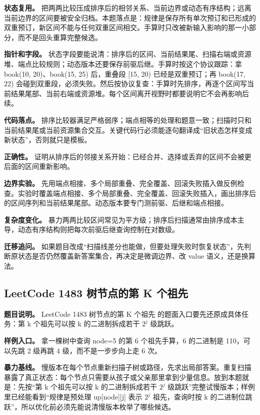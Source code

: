 \textbf{状态复用。} 把两两比较压成排序后的相邻关系、当前边界或动态有序结构；远离当前边界的区间要被安全归档。本题落点是：规律是保存所有单次预订和已形成的双重预订，新区间不能与任何双重区间相交。手算时只改被新输入影响的那一小部分，而不是回头重算完整候选。

\textbf{指针和字段。} 状态字段要能说清：排序后的区间、当前结果尾、扫描右端或资源堆、端点比较规则；动态版本还要保存前驱后继。手算时按这个协议跟踪：拿 book(10, 20)、book(15, 25) 后，重叠段 [15, 20) 已经是双重预订；再 book(17, 22) 会碰到双重段，必须失败。然后按协议复查：手算时先排序，再逐个区间写当前结果尾部、当前右端或资源堆。每个区间离开视野时都要说明它不会再影响后续。

\textbf{代码落点。} 排序比较器满足严格弱序；端点相等的处理和题意一致；扫描时只和当前结果尾或当前资源集合交互。关键代码行必须能逐句翻译成“旧状态怎样变成新状态”，否则就只是模板。

\textbf{正确性。} 证明从排序后的邻接关系开始：已经合并、选择或丢弃的区间不会被更后面的区间重新影响。

\textbf{边界实验。} 先用端点相接、多个局部重叠、完全覆盖、回滚失败插入做反例检查。实验时覆盖端点相接、多个局部重叠、完全覆盖、回滚失败插入，画出排序后的区间序列和当前结果尾部。动态版本要专门测前驱、后继和端点相接。

\textbf{复杂度变化。} 暴力两两比较区间常见为平方级；排序后扫描通常由排序成本主导，动态有序结构则把每次前驱后继查询控制在对数级。

\textbf{迁移追问。} 如果题目改成“扫描线差分也能做，但要处理失败时恢复状态”，先判断原状态是否仍然覆盖新答案集合，再决定是微调边界、改 value 语义，还是换算法。

\subsection{LeetCode 1483 树节点的第 K 个祖先}

\textbf{题目说明。} LeetCode 1483 树节点的第 K 个祖先 的题面入口要先还原成具体任务：第 k 个祖先可以按 k 的二进制拆成若干 \ensuremath{2^{j}} 级跳跃。

\textbf{样例入口。} 拿一棵树中查询 node=5 的第 6 个祖先手算，6 的二进制是 110，可以先跳 2 级再跳 4 级，而不是一步步向上走 6 次。

\textbf{暴力基线。} 慢版本在每个节点重新扫描子树或路径，先求出局部答案。重复扫描暴露了真正状态：每个节点只需要从孩子或父亲那里拿到少量信息。放到本题就是：先按“第 k 个祖先可以按 k 的二进制拆成若干 \ensuremath{2^{j}} 级跳跃”完整试慢版本；样例里已经能看到“规律是预处理 up[node][j] 表示 \ensuremath{2^{j}} 祖先，查询时按 k 的二进制位跳跃”，所以优化前必须先能说清慢版本枚举了哪些候选。

